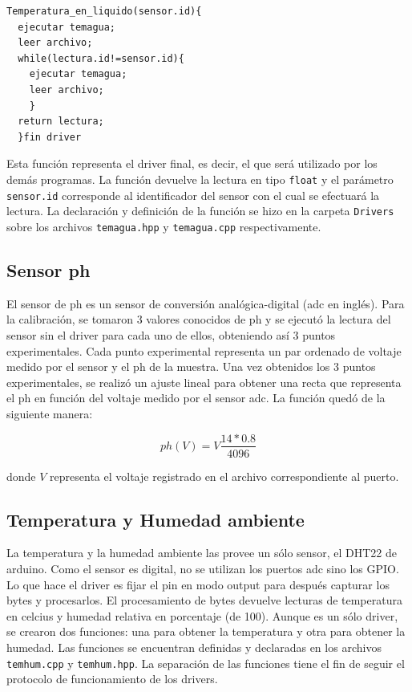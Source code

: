 \documentclass[a4paper,10pt,titlepage]{article}
\begin{document}
\begin{verbatim}
Temperatura_en_liquido(sensor.id){
  ejecutar temagua;
  leer archivo;
  while(lectura.id!=sensor.id){
    ejecutar temagua;
    leer archivo;
    }
  return lectura;
  }fin driver
\end{verbatim}

Esta funci\'on representa el driver final, es decir, el que ser\'a utilizado por los dem\'as programas. La funci\'on devuelve la lectura en tipo \verb|float| y el 
par\'ametro 
\verb|sensor.id| 
corresponde al identificador del sensor con el cual se efectuar\'a la 
lectura. La declaraci\'on y definici\'on de la funci\'on se hizo en la carpeta \verb|Drivers| sobre los archivos 
\verb|temagua.hpp| y \verb|temagua.cpp| respectivamente.

\subsection{Sensor ph}
El sensor de ph es un sensor de conversi\'on anal\'ogica-digital (adc en 
ingl\'es). Para la calibraci\'on, se tomaron 3 valores conocidos de ph y se ejecut\'o la lectura del sensor sin el driver para cada uno de ellos, obteniendo as\'i 3 puntos 
experimentales. Cada punto experimental representa un par ordenado de voltaje medido por el sensor y el ph de la muestra. Una vez obtenidos los 3 puntos 
experimentales, 
se realiz\'o un ajuste lineal para obtener una recta que 
representa el ph en funci\'on del voltaje medido por el sensor adc. La funci\'on 
qued\'o de la siguiente manera:

\begin{equation}
	ph(V)=V \frac{14*0.8}{4096} 
	\label{ph}
\end{equation}

donde $V$ representa el voltaje registrado 
en el archivo correspondiente al puerto.

\subsection{Temperatura y Humedad ambiente}
La temperatura y la humedad ambiente las provee un s\'olo sensor, el DHT22 de arduino. Como el sensor es digital, no se utilizan los puertos adc sino los GPIO. Lo que hace 
el driver es fijar el pin en modo output para despu\'es 
capturar los bytes y procesarlos. El procesamiento de bytes devuelve lecturas de temperatura en celcius y humedad relativa en porcentaje (de 100). Aunque es un s\'olo 
driver, se crearon dos funciones: 
una para obtener la temperatura y otra para obtener la humedad. Las funciones se encuentran definidas y declaradas en los archivos \verb|temhum.cpp| y \verb|temhum.hpp|. La 
separaci\'on de las funciones tiene el 
fin de seguir el protocolo de funcionamiento de los drivers.
\end{document}
